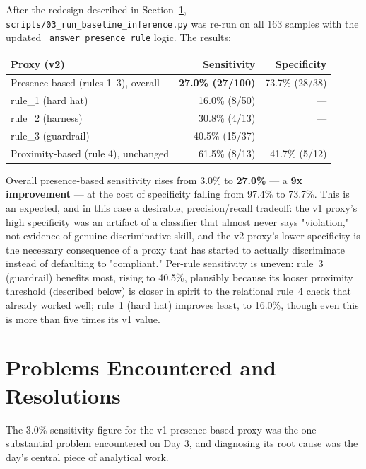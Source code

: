 After the redesign described in Section~\ref{sec:day03-problems}, \texttt{scripts/03\_run\_baseline\_inference.py}
was re-run on all 163 samples with the updated \texttt{\_answer\_presence\_rule} logic. The results:

\begin{center}
\begin{tabular}{lrr}
\toprule
\textbf{Proxy (v2)} & \textbf{Sensitivity} & \textbf{Specificity} \\
\midrule
Presence-based (rules 1--3), overall & \textbf{27.0\% (27/100)} & 73.7\% (28/38) \\
\quad rule\_1 (hard hat) & 16.0\% (8/50) & --- \\
\quad rule\_2 (harness) & 30.8\% (4/13) & --- \\
\quad rule\_3 (guardrail) & 40.5\% (15/37) & --- \\
Proximity-based (rule 4), unchanged & 61.5\% (8/13) & 41.7\% (5/12) \\
\bottomrule
\end{tabular}
\end{center}

Overall presence-based sensitivity rises from 3.0\% to \textbf{27.0\%} --- a \textbf{9x
improvement} --- at the cost of specificity falling from 97.4\% to 73.7\%. This is an expected, and
in this case a desirable, precision/recall tradeoff: the v1 proxy's high specificity was an
artifact of a classifier that almost never says "violation," not evidence of genuine discriminative
skill, and the v2 proxy's lower specificity is the necessary consequence of a proxy that has
started to actually discriminate instead of defaulting to "compliant." Per-rule sensitivity is
uneven: rule~3 (guardrail) benefits most, rising to 40.5\%, plausibly because its looser proximity
threshold (described below) is closer in spirit to the relational rule~4 check that already worked
well; rule~1 (hard hat) improves least, to 16.0\%, though even this is more than five times its v1
value.

\section{Problems Encountered and Resolutions}
\label{sec:day03-problems}

The 3.0\% sensitivity figure for the v1 presence-based proxy was the one substantial problem
encountered on Day 3, and diagnosing its root cause was the day's central piece of analytical work.

